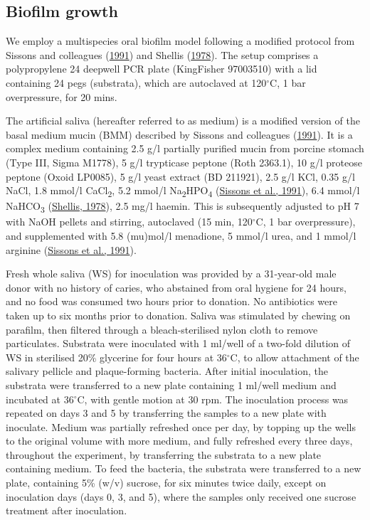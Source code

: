 \documentclass[
  b5paper,
]{book}
\begin{document}
\hypertarget{biofilm-growth}{%
\subsection{Biofilm growth}\label{biofilm-growth}}

We employ a multispecies oral biofilm model following a modified
protocol from Sissons and colleagues
(\protect\hyperlink{ref-sissonsMultistationPlaque1991}{1991}) and
Shellis (\protect\hyperlink{ref-shellisSyntheticSaliva1978}{1978}). The
setup comprises a polypropylene 24 deepwell PCR plate (KingFisher
97003510) with a lid containing 24 pegs (substrata), which are
autoclaved at 120\(^{\circ}\)C, 1 bar overpressure, for 20 mins.

The artificial saliva (hereafter referred to as medium) is a modified
version of the basal medium mucin (BMM) described by Sissons and
colleagues
(\protect\hyperlink{ref-sissonsMultistationPlaque1991}{1991}). It is a
complex medium containing 2.5 g/l partially purified mucin from porcine
stomach (Type III, Sigma M1778), 5 g/l trypticase peptone (Roth 2363.1),
10 g/l proteose peptone (Oxoid LP0085), 5 g/l yeast extract (BD 211921),
2.5 g/l KCl, 0.35 g/l NaCl, 1.8 mmol/l CaCl\textsubscript{2}, 5.2 mmol/l
Na\textsubscript{2}HPO\textsubscript{4}
(\protect\hyperlink{ref-sissonsMultistationPlaque1991}{Sissons et al.,
1991}), 6.4 mmol/l NaHCO\textsubscript{3}
(\protect\hyperlink{ref-shellisSyntheticSaliva1978}{Shellis, 1978}), 2.5
mg/l haemin. This is subsequently adjusted to pH 7 with NaOH pellets and
stirring, autoclaved (15 min, 120\(^{\circ}\)C, 1 bar overpressure), and
supplemented with 5.8 (mu)mol/l menadione, 5 mmol/l urea, and 1 mmol/l
arginine (\protect\hyperlink{ref-sissonsMultistationPlaque1991}{Sissons
et al., 1991}).

Fresh whole saliva (WS) for inoculation was provided by a 31-year-old
male donor with no history of caries, who abstained from oral hygiene
for 24 hours, and no food was consumed two hours prior to donation. No
antibiotics were taken up to six months prior to donation. Saliva was
stimulated by chewing on parafilm, then filtered through a
bleach-sterilised nylon cloth to remove particulates. Substrata were
inoculated with 1 ml/well of a two-fold dilution of WS in sterilised
20\% glycerine for four hours at 36\(^{\circ}\)C, to allow attachment of
the salivary pellicle and plaque-forming bacteria. After initial
inoculation, the substrata were transferred to a new plate containing 1
ml/well medium and incubated at 36\(^{\circ}\)C, with gentle motion at
30 rpm. The inoculation process was repeated on days 3 and 5 by
transferring the samples to a new plate with inoculate. Medium was
partially refreshed once per day, by topping up the wells to the
original volume with more medium, and fully refreshed every three days,
throughout the experiment, by transferring the substrata to a new plate
containing medium. To feed the bacteria, the substrata were transferred
to a new plate, containing 5\% (w/v) sucrose, for six minutes twice
daily, except on inoculation days (days 0, 3, and 5), where the samples
only received one sucrose treatment after inoculation.
\end{document}
